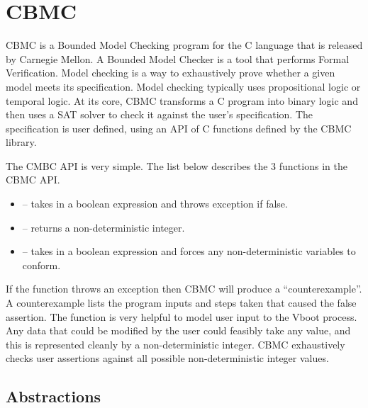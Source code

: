 \section{CBMC}

CBMC is a Bounded Model Checking program for the C language that is released by
Carnegie Mellon. 
A Bounded Model Checker is a tool that performs Formal Verification.
Model checking is a way to exhaustively prove whether a given model meets its
specification.
Model checking typically uses propositional logic or temporal logic. 
At its core, CBMC transforms a C program into binary logic and
then uses a SAT solver to check it against the user's specification. 
The specification is user defined, using an API of C functions defined by the
CBMC library. 


The CMBC API is very simple.
The list below describes the 3 functions in the CBMC API.

\begin{itemize}
    \item {} -- takes in a boolean expression and throws
        exception if false.
    \item {} -- returns a non-deterministic integer.
    \item {} -- takes in a boolean expression and forces any
        non-deterministic variables to conform.
\end{itemize}

If the  function throws an exception then CBMC will produce a ``counterexample''.
A counterexample lists the program inputs and steps taken that caused the false
assertion.
The  function is very helpful to model user input to the Vboot process.
Any data that could be modified by the user could feasibly take any
value, and this is represented cleanly by a non-deterministic integer.
CBMC exhaustively checks user assertions against all possible non-deterministic
integer values.

\subsection{Abstractions}

